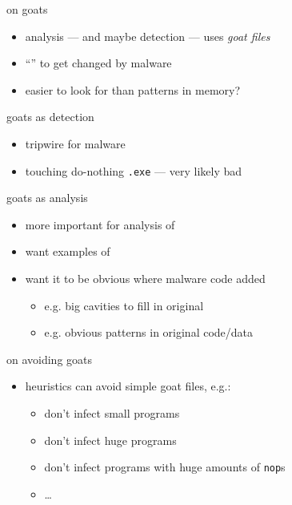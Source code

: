 \begin{frame}{on goats}
    \begin{itemize}
    \item analysis --- and maybe detection --- uses \textit{goat files}
    \item ``'' to get changed by malware
    \vspace{.5cm}
    \item easier to look for than patterns in memory?
    \end{itemize}
\end{frame}

\begin{frame}{goats as detection}
    \begin{itemize}
    \item tripwire for malware
    \item touching do-nothing {\tt .exe} --- very likely bad
    \end{itemize}
\end{frame}

\begin{frame}{goats as analysis}
    \begin{itemize}
    \item more important for analysis of 
    \item want examples of 
    \item want it to be obvious where malware code added
        \begin{itemize}
        \item e.g. big cavities to fill in original
        \item e.g. obvious patterns in original code/data
        \end{itemize}
    \end{itemize}
\end{frame}

\begin{frame}{on avoiding goats}
    \begin{itemize}
    \item heuristics can avoid simple goat files, e.g.:
        \begin{itemize}
        \item don't infect small programs
        \item don't infect huge programs
        \item don't infect programs with huge amounts of {\tt nop}s
        \item \ldots
        \end{itemize}
    \end{itemize}
\end{frame}

